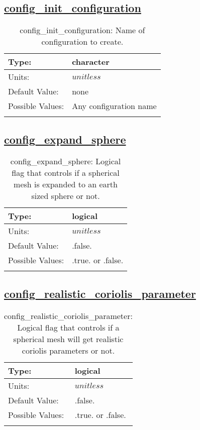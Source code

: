 \subsection[config\_init\_configuration]{\hyperref[sec:nm_tab_init_setup]{config\_init\_configuration}}
\label{subsec:nm_sec_config_init_configuration}
\begin{center}
\begin{longtable}{| p{2.0in} || p{4.0in} |}
    \hline
    Type: & character \\
    \hline
    Units: & $unitless$ \\
    \hline
    Default Value: & none \\
    \hline
    Possible Values: & Any configuration name \\
    \hline
    \caption{config\_init\_configuration: Name of configuration to create.}
\end{longtable}
\end{center}
\subsection[config\_expand\_sphere]{\hyperref[sec:nm_tab_init_setup]{config\_expand\_sphere}}
\label{subsec:nm_sec_config_expand_sphere}
\begin{center}
\begin{longtable}{| p{2.0in} || p{4.0in} |}
    \hline
    Type: & logical \\
    \hline
    Units: & $unitless$ \\
    \hline
    Default Value: & .false. \\
    \hline
    Possible Values: & .true. or .false. \\
    \hline
    \caption{config\_expand\_sphere: Logical flag that controls if a spherical mesh is expanded to an earth sized sphere or not.}
\end{longtable}
\end{center}
\subsection[config\_realistic\_coriolis\_parameter]{\hyperref[sec:nm_tab_init_setup]{config\_realistic\_coriolis\_parameter}}
\label{subsec:nm_sec_config_realistic_coriolis_parameter}
\begin{center}
\begin{longtable}{| p{2.0in} || p{4.0in} |}
    \hline
    Type: & logical \\
    \hline
    Units: & $unitless$ \\
    \hline
    Default Value: & .false. \\
    \hline
    Possible Values: & .true. or .false. \\
    \hline
    \caption{config\_realistic\_coriolis\_parameter: Logical flag that controls if a spherical mesh will get realistic coriolis parameters or not.}
\end{longtable}
\end{center}
